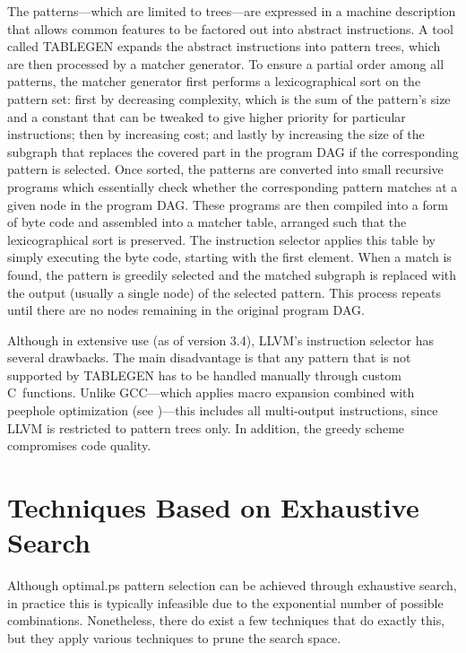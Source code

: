 The \glspl{pattern}---which are limited to \glspl{tree}---are expressed in a
\gls{machine description} that allows common features to be factored out into
abstract \glspl{instruction}.
%
A tool called \gls{TABLEGEN} expands the abstract
\glspl{instruction} into \glspl{pattern tree}, which are then processed by a
matcher generator.
%
To ensure a partial order among all \glspl{pattern}, the
matcher generator first performs a lexicographical sort on the \gls{pattern
  set}: first by decreasing complexity, which is the sum of the \gls{pattern}'s
size and a constant that can be tweaked to give higher priority for particular
\glspl{instruction}; then by increasing cost; and lastly by increasing the size
of the \gls{subgraph} that replaces the covered part in the \gls{program DAG} if
the corresponding \gls{pattern} is selected.
%
Once sorted, the \glspl{pattern}
are converted into small recursive \glspl{program} which essentially check
whether the corresponding \gls{pattern} matches at a given \gls{node} in the
\gls{program DAG}.
%
These \glspl{program} are then compiled into a form of byte
code and assembled into a matcher table, arranged such that the lexicographical
sort is preserved.
%
The \gls{instruction selector} applies this table by simply
executing the byte code, starting with the first element.
%
When a \gls{match} is
found, the \gls{pattern} is greedily selected and the matched \gls{subgraph} is
replaced with the output (usually a single \gls{node}) of the selected
\gls{pattern}.
%
This process repeats until there are no \glspl{node} remaining in
the original \gls{program DAG}.

Although in extensive use (as of version 3.4), \gls{LLVM}'s \gls{instruction
  selector} has several drawbacks.
%
The main disadvantage is that any
\gls{pattern} that is not supported by \gls{TABLEGEN} has to be handled manually
through custom \gls{C}~functions.
%
Unlike \gls{GCC}---which applies \gls{macro
  expansion} combined with \gls{peephole optimization} (see
)---this includes all
\glspl{multi-output instruction}, since \gls{LLVM} is restricted to
\glspl{pattern tree} only.
%
In addition, the greedy scheme compromises code
quality.


\section{Techniques Based on Exhaustive Search}

Although \gls{optimal.ps} \gls{pattern selection} can be achieved through
exhaustive search, in practice this is typically infeasible due to the
exponential number of possible combinations.
%
Nonetheless, there do exist a few
techniques that do exactly this, but they apply various techniques to prune the
search space.



